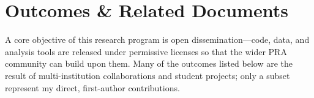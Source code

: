 \section{Outcomes \& Related Documents}

A core objective of this research program is open dissemination—code, data, and analysis tools are released under permissive licenses so that the wider PRA community can build upon them.  Many of the outcomes listed below are the result of multi-institution collaborations and student projects; only a subset represent my direct, first-author contributions.





% 






